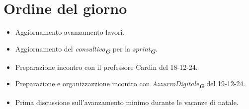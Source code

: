 

\section{Ordine del giorno}

\begin{itemize}
    \item Aggiornamento avanzamento lavori.
    \item Aggiornamento del \emph{consultivo}\textsubscript{\textit{\textbf{G}}} per la \emph{sprint}\textsubscript{\textit{\textbf{G}}}.
    \item Preparazione incontro con il professore Cardin del 18-12-24.
    \item Preparazione e organizzazzione incontro con \emph{AzzurroDigitale}\textsubscript{\textit{\textbf{G}}} del 19-12-24.
    \item Prima discussione sull'avanzamento minimo durante le vacanze di natale.
\end{itemize}

